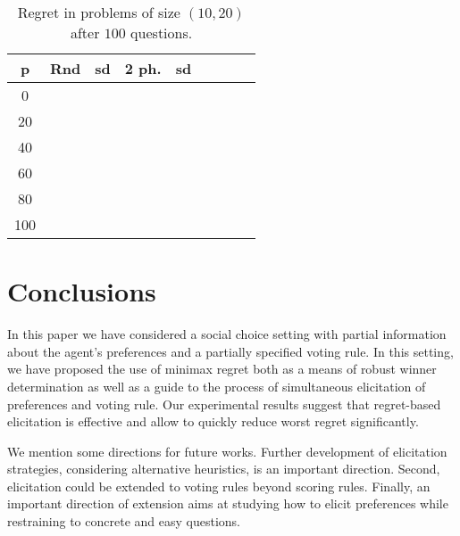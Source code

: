 \begin{table}
	\begin{center}
		\begin{tabular}{S[table-figures-integer=2, table-number-alignment = right, table-figures-decimal=0]S[table-number-alignment = right]@{ ± }S[table-number-alignment = left]S[table-number-alignment = right]@{ ± }S[table-number-alignment = left]S[table-number-alignment = right]@{ ± }S[table-number-alignment = left]S[table-number-alignment = right]@{ ± }S[table-number-alignment = left]}
			\toprule
			{p} & {Rnd} & {sd} & {2 ph.} & {sd} \\
			 &  &  &  &  \\
			20 &  &  &  &  \\
			40 &  &  &  &  \\
			60 &  &  &  &  \\
			80 &  &  &  &  \\
			100 &  &  &  &  \\
			\bottomrule
		\end{tabular}
	\end{center}
	\caption{Regret in problems of size $(10, 20)$ after $100$ questions.}
	\label{fig:p}
\end{table}

\section{Conclusions}  
\label{sec:conclusions}
In this paper we have considered a social choice setting with partial information about the agent's preferences and a partially specified voting rule.
In this setting, we have proposed the use of minimax regret both as a means of robust winner determination as well as a guide to the process of simultaneous elicitation of preferences and voting rule.
Our experimental results %
suggest that regret-based elicitation is effective and allow to quickly reduce worst regret significantly.


We mention some directions for future works.
Further development of elicitation strategies, considering alternative heuristics, is an important direction. 
Second, elicitation could be extended to voting rules beyond scoring rules.
Finally, an important direction of extension aims at studying how to elicit preferences while restraining to concrete and easy questions.

%
 
%

